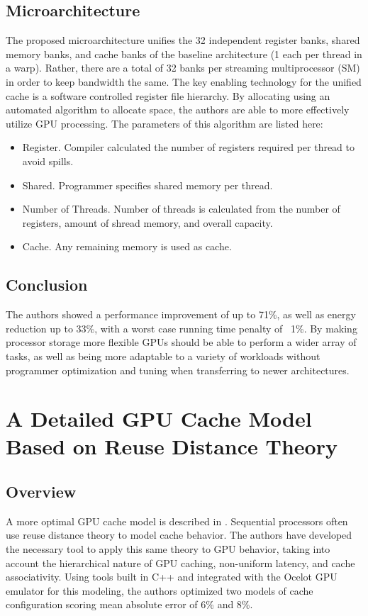 \documentclass[conference]{IEEEtran}
\begin{document}
\subsection{Microarchitecture}
The proposed microarchitecture unifies the 32 independent register banks,
shared memory banks, and cache banks of the baseline architecture (1 each 
per thread in a warp). Rather, there are a total of 32 banks per streaming
multiprocessor (SM) in order to keep bandwidth the same. The key enabling
technology for the unified cache is a software controlled register file
hierarchy. By allocating using an automated algorithm to allocate space, 
the authors are able to more effectively utilize GPU processing. 
The parameters of this algorithm are listed here: 
\begin{itemize}
    \item Register. Compiler calculated the number of registers 
        required per thread to avoid spills.
    \item Shared. Programmer specifies shared memory per thread.
    \item Number of Threads. Number of threads is calculated from
        the number of registers, amount of shread memory, and overall 
        capacity.
    \item Cache. Any remaining memory is used as cache.
\end{itemize}

\subsection{Conclusion}
The authors showed a performance improvement of up to 71\%, as well as energy
reduction up to 33\%, with a worst case running time penalty of ~1\%.
By making processor storage more flexible GPUs should be able to perform a 
wider array of tasks, as well as being more adaptable to a variety of workloads
without programmer optimization and tuning when transferring to newer 
architectures.

\section{A Detailed GPU Cache Model Based on Reuse Distance Theory}
\subsection{Overview}
A more optimal GPU cache model is described in \cite{cache}. Sequential
processors often use reuse distance theory to model cache behavior. The authors
have developed the necessary tool to apply this same theory to GPU behavior,
taking into account the hierarchical nature of GPU caching, non-uniform latency,
and cache associativity. Using tools built in C++ and integrated with the 
Ocelot GPU emulator for this modeling, the authors optimized two models of
cache configuration scoring mean absolute error of 6\% and 8\%.
\end{document}
